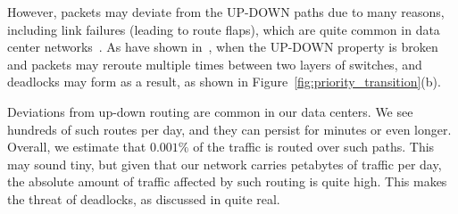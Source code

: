 
However, packets may deviate from the UP-DOWN paths due to many reasons,
including link failures (leading to route flaps), which are quite common in data
center networks~\cite{netpilot,f10}.  As have shown
in~\cite{shpiner2016unlocking}, when the UP-DOWN property is broken and packets
may reroute multiple times between two layers of switches, and deadlocks may
form as a result, as shown in Figure~\ref{fig:priority_transition}(b).

Deviations from up-down routing are common in our data centers.  We
see hundreds of such routes per day, and they can persist for minutes or even
longer. Overall, we estimate that $0.001\%$ of the traffic is routed over such
paths. This may sound tiny, but given that our network carries petabytes of
traffic per day, the absolute amount of traffic affected by such routing is
quite high. This makes the threat of deadlocks, as discussed
in\cite{rdmaatscale,shpiner2016unlocking,hu2016deadlocks} quite real.

